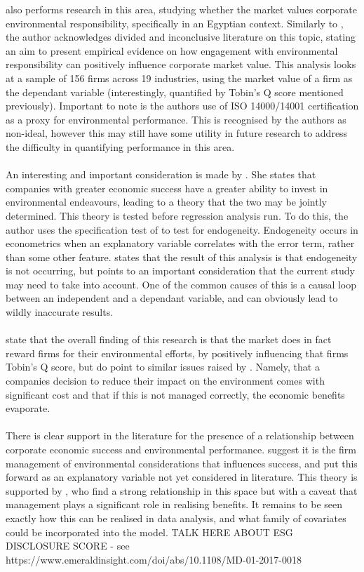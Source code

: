 {\cite{wahba2008does} also performs research in this area, studying whether the market values corporate environmental responsibility, specifically in an Egyptian context. Similarly to \cite{schaltegger2002link}, the author acknowledges divided and inconclusive literature on this topic, stating an aim to present empirical evidence on how engagement with environmental responsibility can positively influence corporate market value. This analysis looks at a sample of 156 firms across 19 industries, using the market value of a firm as the dependant variable (interestingly, quantified by Tobin's Q score mentioned previously). Important to note is the authors use of ISO 14000/14001 certification as a proxy for environmental performance. This is recognised by the authors as non-ideal, however this may still have some utility in future research to address the difficulty in quantifying performance in this area. \\\\
An interesting and important consideration is made by \cite{wahba2008does}. She states that companies with greater economic success have a greater ability to invest in environmental endeavours, leading to a theory that the two may be jointly determined. This theory is tested before regression analysis run. To do this, the author uses the specification test of \cite{hausman1978specification} to test for endogeneity. Endogeneity occurs in econometrics when an explanatory variable correlates with the error term, rather than some other feature. \cite{wahba2008does} states that the result of this analysis is that endogeneity is not occurring, but points to an important consideration that the current study may need to take into account. One of the common causes of this is a causal loop between an independent and a dependant variable, and can obviously lead to wildly inaccurate results. \\\\
 \cite{wahba2008does} state that the overall finding of this research is that the market does in fact reward firms for their environmental efforts, by positively influencing that firms Tobin's Q score, but do point to similar issues raised by \cite{schaltegger2002link}. Namely, that a companies decision to reduce their impact on the environment comes with significant cost and that if this is not managed correctly, the economic benefits evaporate.     \\\\
There is clear support in the literature for the presence of a relationship between corporate economic success and environmental performance. \cite{schaltegger2002link} suggest it is the firm management of environmental considerations that influences success, and put this forward as an explanatory variable not yet considered in literature. This theory is supported by \cite{wahba2008does}, who find a strong relationship in this space but with a caveat that management plays a significant role in realising benefits. It remains to be seen exactly how this can be realised in data analysis, and what family of covariates could be incorporated into the model.  }
{TALK HERE ABOUT ESG DISCLOSURE SCORE - see https://www.emeraldinsight.com/doi/abs/10.1108/MD-01-2017-0018}
